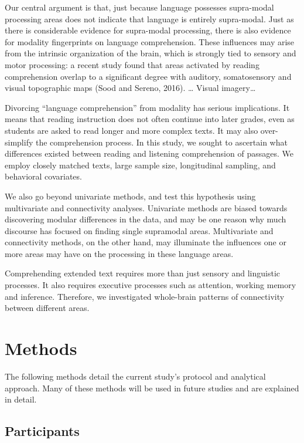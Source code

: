 Our central argument is that, just because language possesses supra-modal processing areas does not indicate that language is entirely supra-modal. Just as there is considerable evidence for supra-modal processing, there is also evidence for modality fingerprints on language comprehension. These influences may arise from the intrinsic organization of the brain, which is strongly tied to sensory and motor processing: a recent study found that areas activated by reading comprehension overlap to a significant degree with auditory, somatosensory and visual topographic maps (Sood and Sereno, 2016). … Visual imagery… 

Divorcing “language comprehension” from modality has serious implications. It means that reading instruction does not often continue into later grades, even as students are asked to read longer and more complex texts. It may also over-simplify the comprehension process. 
In this study, we sought to ascertain what differences existed between reading and listening comprehension of passages. We employ closely matched texts, large sample size, longitudinal sampling, and behavioral covariates. 

We also go beyond univariate methods, and test this hypothesis using multivariate and connectivity analyses. Univariate methods are biased towards discovering modular differences in the data, and may be one reason why much discourse has focused on finding single supramodal areas. Multivariate and connectivity methods, on the other hand, may illuminate the influences one or more areas may have on the processing in these language areas. 

Comprehending extended text requires more than just sensory and linguistic processes. It also requires executive processes such as attention, working memory and inference. Therefore, we investigated whole-brain patterns of connectivity between different areas. 



\section{Methods}

The following methods detail the current study's protocol and analytical approach. Many of these methods will be used in future studies and are explained in detail. 

\subsection{Participants}

